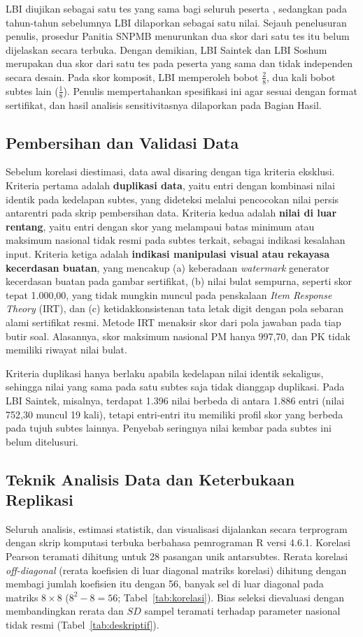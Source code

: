 LBI diujikan sebagai satu tes yang sama bagi seluruh peserta \autocite{detik2026lbi}, sedangkan pada tahun-tahun sebelumnya LBI dilaporkan sebagai satu nilai. Sejauh penelusuran penulis, prosedur Panitia SNPMB menurunkan dua skor dari satu tes itu belum dijelaskan secara terbuka. Dengan demikian, LBI Saintek dan LBI Soshum merupakan dua skor dari satu tes pada peserta yang sama dan tidak independen secara desain. Pada skor komposit, LBI memperoleh bobot $\frac{2}{8}$, dua kali bobot subtes lain ($\frac{1}{8}$). Penulis mempertahankan spesifikasi ini agar sesuai dengan format sertifikat, dan hasil analisis sensitivitasnya dilaporkan pada Bagian Hasil.

\subsection{Pembersihan dan Validasi Data}
Sebelum korelasi diestimasi, data awal disaring dengan tiga kriteria eksklusi. Kriteria pertama adalah \textbf{duplikasi data}, yaitu entri dengan kombinasi nilai identik pada kedelapan subtes, yang dideteksi melalui pencocokan nilai persis antarentri pada skrip pembersihan data. Kriteria kedua adalah \textbf{nilai di luar rentang}, yaitu entri dengan skor yang melampaui batas minimum atau maksimum nasional tidak resmi pada subtes terkait, sebagai indikasi kesalahan input. Kriteria ketiga adalah \textbf{indikasi manipulasi visual atau rekayasa kecerdasan buatan}, yang mencakup (a) keberadaan \textit{watermark} generator kecerdasan buatan pada gambar sertifikat, (b) nilai bulat sempurna, seperti skor tepat 1.000,00, yang tidak mungkin muncul pada penskalaan \textit{Item Response Theory} (IRT), dan (c) ketidakkonsistenan tata letak digit dengan pola sebaran alami sertifikat resmi. Metode IRT menaksir skor dari pola jawaban pada tiap butir soal. Alasannya, skor maksimum nasional PM hanya 997,70, dan PK tidak memiliki riwayat nilai bulat.

Kriteria duplikasi hanya berlaku apabila kedelapan nilai identik sekaligus, sehingga nilai yang sama pada satu subtes saja tidak dianggap duplikasi. Pada LBI Saintek, misalnya, terdapat 1.396 nilai berbeda di antara 1.886 entri (nilai 752,30 muncul 19 kali), tetapi entri-entri itu memiliki profil skor yang berbeda pada tujuh subtes lainnya. Penyebab seringnya nilai kembar pada subtes ini belum ditelusuri.

\subsection{Teknik Analisis Data dan Keterbukaan Replikasi}
Seluruh analisis, estimasi statistik, dan visualisasi dijalankan secara terprogram dengan skrip komputasi terbuka berbahasa pemrograman R versi 4.6.1. Korelasi Pearson teramati dihitung untuk 28 pasangan unik antarsubtes. Rerata korelasi \textit{off-diagonal} (rerata koefisien di luar diagonal matriks korelasi) dihitung dengan membagi jumlah koefisien itu dengan 56, banyak sel di luar diagonal pada matriks $8 \times 8$ ($8^2 - 8 = 56$; Tabel~\ref{tab:korelasi}). Bias seleksi dievaluasi dengan membandingkan rerata dan $SD$ sampel teramati terhadap parameter nasional tidak resmi (Tabel~\ref{tab:deskriptif}).

